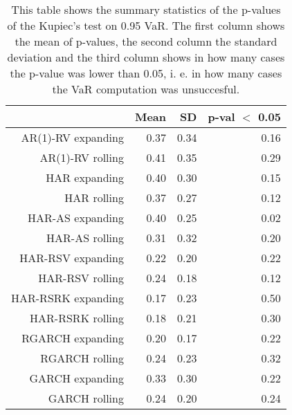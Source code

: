 \begin{table}[ht]
\centering
\begin{tabular}{rrrr}
  \hline
 & Mean & SD & p-val $<$ 0.05 \\ 
  \hline
AR(1)-RV expanding & 0.37 & 0.34 & 0.16 \\ 
  AR(1)-RV rolling & 0.41 & 0.35 & 0.29 \\ 
  HAR expanding & 0.40 & 0.30 & 0.15 \\ 
  HAR rolling & 0.37 & 0.27 & 0.12 \\ 
  HAR-AS expanding & 0.40 & 0.25 & 0.02 \\ 
  HAR-AS rolling & 0.31 & 0.32 & 0.20 \\ 
  HAR-RSV expanding & 0.22 & 0.20 & 0.22 \\ 
  HAR-RSV rolling & 0.24 & 0.18 & 0.12 \\ 
  HAR-RSRK expanding & 0.17 & 0.23 & 0.50 \\ 
  HAR-RSRK rolling & 0.18 & 0.21 & 0.30 \\ 
  RGARCH expanding & 0.20 & 0.17 & 0.22 \\ 
  RGARCH rolling & 0.24 & 0.23 & 0.32 \\ 
  GARCH expanding & 0.33 & 0.30 & 0.22 \\ 
  GARCH rolling & 0.24 & 0.20 & 0.24 \\ 
   \hline
\end{tabular}
\caption[Kupiec's test p-values summary, alpha =0.95]{This table shows the summary statistics of the p-values of the Kupiec's test on 0.95 VaR. 
            The first column shows the mean of p-values, the second column the standard deviation 
            and the third column shows in how many cases the p-value was lower than 0.05, i. e. in how many cases the VaR computation was unsuccesful.} 
\label{Table:Kupiec_test_summary_0.95}
\end{table}
